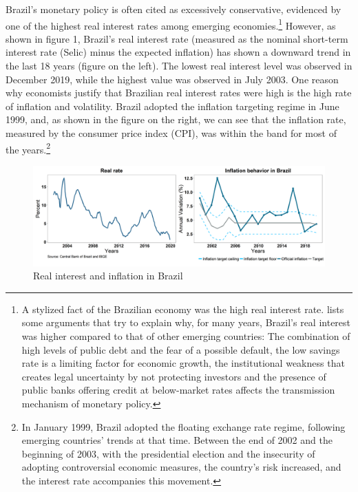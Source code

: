 \documentclass[12pt,oneside,a4paper]{article}
\begin{document}
Brazil's monetary policy is often cited as excessively conservative, evidenced by one of the highest real interest rates among emerging economies.\footnote{A stylized fact of the Brazilian economy was the high real interest rate. \citet{SEGURA-UBIERGO:2012} lists some arguments that try to explain why, for many years, Brazil's real interest was higher compared to that of other emerging countries: The combination of high levels of public debt and the fear of a possible default, the low savings rate is a limiting factor for economic growth, the institutional weakness that creates legal uncertainty by not protecting investors and the presence of public banks offering credit at below-market rates affects the transmission mechanism of monetary policy.} However, as shown in figure 1, Brazil's real interest rate (measured as the nominal short-term interest rate (Selic) minus the expected inflation) has shown a downward trend in the last 18 years (figure on the left). The lowest real interest level was observed in December 2019, while the highest value was observed in July 2003. One reason why economists justify that Brazilian real interest rates were high is the high rate of inflation and volatility. Brazil adopted the inflation targeting regime in June 1999, and, as shown in the figure on the right, we can see that the inflation rate, measured by the consumer price index (CPI), was within the band for most of the years.\footnote{In January 1999, Brazil adopted the floating exchange rate regime, following emerging countries' trends at that time. Between the end of 2002 and the beginning of 2003, with the presidential election and the insecurity of adopting controversial economic measures, the country's risk increased, and the interest rate accompanies this movement.}


\begin{figure}[H]
\centering
\caption{Real interest and inflation in Brazil}
\includegraphics[scale=0.42]{Capitulo_1/Juros_inflacao.png}

\end{figure}
\end{document}
